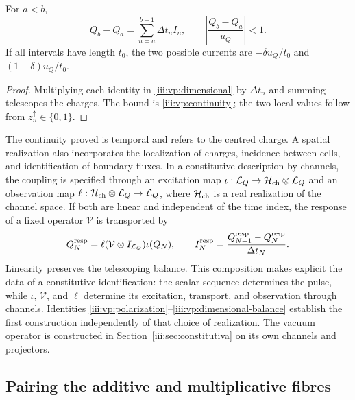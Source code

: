 \begin{proposition}
For $a<b$,
\begin{equation}
 Q_b-Q_a=\sum_{n=a}^{b-1}\Delta t_n I_n,
 \qquad
 \left|\frac{Q_b-Q_a}{u_Q}\right|<1.
 \label{iii:vp:dimensional-balance}
\end{equation}
If all intervals have length $t_0$, the two possible currents
are $-\delta u_Q/t_0$ and $(1-\delta)u_Q/t_0$.
\end{proposition}
\begin{proof}
Multiplying each identity in \eqref{iii:vp:dimensional} by
$\Delta t_n$ and summing telescopes the charges. The bound is
\eqref{iii:vp:continuity}; the two local values follow from
$z_n^{\uparrow}\in\{0,1\}$.
\end{proof}

The continuity proved is temporal and refers to the centred charge.
A spatial realization also incorporates the localization of charges,
incidence between cells, and identification of boundary fluxes.
In a constitutive description by channels, the coupling is specified
through an excitation map
$\iota:\mathcal L_Q\to\mathcal H_{\rm ch}\otimes\mathcal L_Q$
and an observation map
$\ell:\mathcal H_{\rm ch}\otimes\mathcal L_Q\to\mathcal L_Q$,
where $\mathcal H_{\rm ch}$ is a real realization of the channel space.
If both are
linear and independent of the time index, the response of a fixed operator
$\mathcal V$ is transported by
\[
 Q_N^{\rm resp}=\ell(\mathcal V\otimes I_{\mathcal L_Q})\iota(Q_N),
 \qquad
 I_N^{\rm resp}=\frac{Q_{N+1}^{\rm resp}-Q_N^{\rm resp}}{\Delta t_N}.
\]
Linearity preserves the telescoping balance. This composition makes
explicit the data of a constitutive identification: the scalar sequence
determines the pulse, while $\iota$, $\mathcal V$, and $\ell$
determine its excitation, transport, and observation through channels. Identities
\eqref{iii:vp:polarization}--\eqref{iii:vp:dimensional-balance}
establish the first construction independently of that choice of
realization. The vacuum operator is constructed in
Section~\ref{iii:sec:constitutiva} on its own channels and projectors.

\subsection{Pairing the additive and multiplicative fibres}

